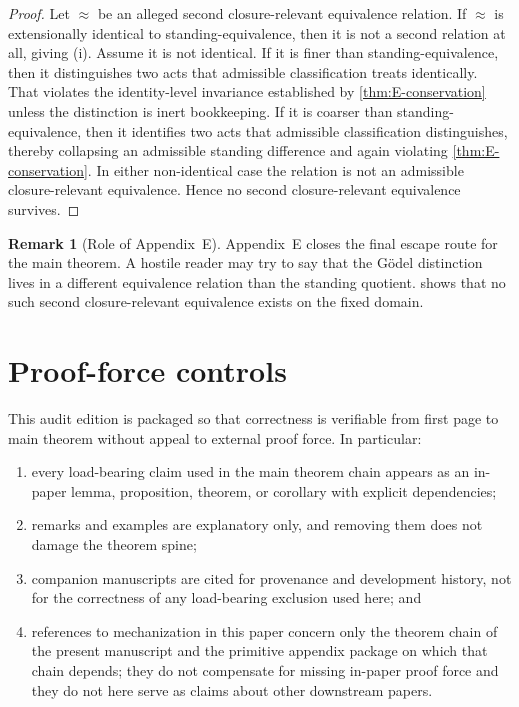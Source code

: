 \documentclass[11pt]{article}
\theoremstyle{plain}
\theoremstyle{definition}
\newtheorem{remark}[theorem]{Remark}
\begin{document}
\begin{proof}
Let $\approx$ be an alleged second closure-relevant equivalence relation. If $\approx$ is extensionally identical to standing-equivalence, then it is not a second relation at all, giving (i). Assume it is not identical. If it is finer than standing-equivalence, then it distinguishes two acts that admissible classification treats identically. That violates the identity-level invariance established by \cref{thm:E-conservation} unless the distinction is inert bookkeeping. If it is coarser than standing-equivalence, then it identifies two acts that admissible classification distinguishes, thereby collapsing an admissible standing difference and again violating \cref{thm:E-conservation}. In either non-identical case the relation is not an admissible closure-relevant equivalence. Hence no second closure-relevant equivalence survives.
\end{proof}

\begin{remark}[Role of Appendix~E]
Appendix~E closes the final escape route for the main theorem. A hostile reader may try to say that the G\"odel distinction lives in a different equivalence relation than the standing quotient.  shows that no such second closure-relevant equivalence exists on the fixed domain.
\end{remark}

\section{Proof-force controls}

This audit edition is packaged so that correctness is verifiable from first page to main theorem without appeal to external proof force. In particular:
\begin{enumerate}[label=(\roman*), leftmargin=2.5em]
    \item every load-bearing claim used in the main theorem chain appears as an in-paper lemma, proposition, theorem, or corollary with explicit dependencies;
    \item remarks and examples are explanatory only, and removing them does not damage the theorem spine;
    \item companion manuscripts are cited for provenance and development history, not for the correctness of any load-bearing exclusion used here; and
    \item references to mechanization in this paper concern only the theorem chain of the present manuscript and the primitive appendix package on which that chain depends; they do not compensate for missing in-paper proof force and they do not here serve as claims about other downstream papers.
\end{enumerate}
\end{document}
